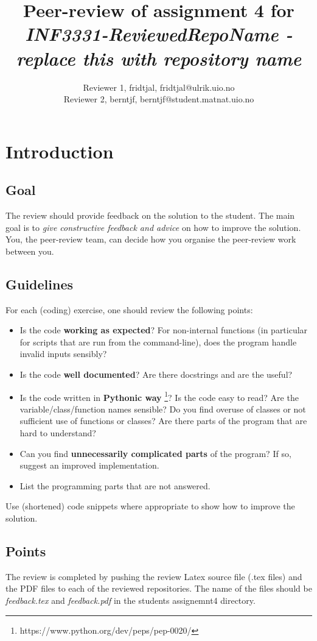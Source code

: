 \documentclass[a4paper]{article}
\title{Peer-review of assignment 4 for \textit{INF3331-ReviewedRepoName - replace this with repository name}}
\author{Reviewer 1, fridtjal, fridtjal@ulrik.uio.no \\
 		Reviewer 2, berntjf, berntjf@student.matnat.uio.no \\}
\begin{document}
\maketitle

\section{Introduction}
\subsection{Goal}
The review should provide feedback on the solution to the student. The main goal is to \emph{give constructive feedback and advice} on how to improve the solution. You, the peer-review team, can decide how you organise the peer-review work between you. 

\subsection{Guidelines}\label{sec:general_review}
For each (coding) exercise, one should review the following points:

\begin{itemize}
  \item Is the code \textbf{working as expected}? For non-internal functions (in particular for scripts that are run from the command-line), does the program handle invalid inputs sensibly?
  \item Is the code \textbf{well documented}? Are there docstrings and are the useful?
  \item Is the code written in \textbf{Pythonic way} \footnote{https://www.python.org/dev/peps/pep-0020/}? Is the code easy to read? Are the variable/class/function names sensible? Do you find overuse of classes or not sufficient use of functions or classes? Are there parts of the program that are hard to understand? 
  \item Can you find \textbf{unnecessarily complicated parts} of the program? If so, suggest an improved implementation.
  \item List the programming parts that are not answered.
\end{itemize}
Use (shortened) code snippets where appropriate to show how to improve the solution. 

\subsection{Points}
The review is completed by pushing the review Latex source file (.tex files) and the PDF files to each of the reviewed repositories. The name of the files should be \emph{feedback.tex} and \emph{feedback.pdf} in the students assignemnt4 directory.
\end{document}

